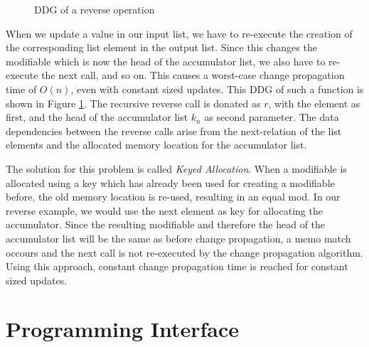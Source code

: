 \begin{figure}
\begin{center}
\end{center}
\caption{DDG of a reverse operation}
\label{fig:reverse_ddg}
\end{figure}

When we update a value in our input list, we have to re-execute the creation of the corresponding list element in the output list. Since this changes the modifiable which is now the head of the accumulator list, we also have to re-execute the next call, and so on. This causes a worst-case change propagation time of $O(n)$, even with constant sized updates. This DDG of such a function is shown in Figure \ref{fig:reverse_ddg}. The recursive reverse call is donated as $r$, with the element as first, and the head of the accumulator list $k_n$ as second parameter. The data dependencies between the reverse calls arise from the next-relation of the list elements and the allocated memory location for the accumulator list. 

The solution for this problem is called \textit{Keyed Allocation}. When a modifiable is allocated using a key which has already been used for creating a modifiable before, the old memory location is re-used, resulting in an equal mod. In our reverse example, we would use the next element as key for allocating the accumulator. Since the resulting modifiable and therefore the head of the accumulator list will be the same as before change propagation, a memo match occours and the next call is not re-executed by the change propagation algorithm. Using this approach, constant change propagation time is reached for constant sized updates. 

\section{Programming Interface}

